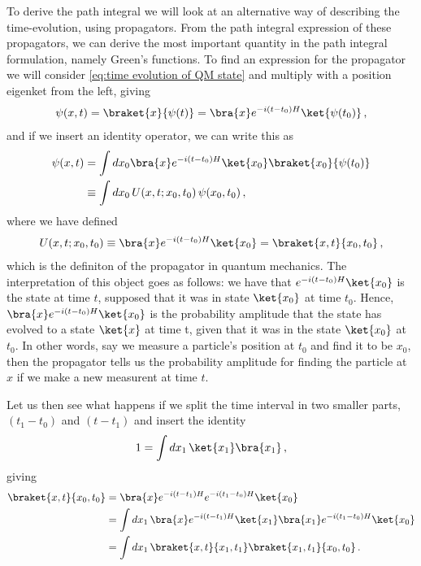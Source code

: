 To derive the path integral we will look at an alternative way of describing the time-evolution, using propagators. From the path integral expression of these propagators, we can derive the most important quantity in the path integral formulation, namely Green's functions. To find an expression for the propagator we will consider \cref{eq:time evolution of QM state} and multiply with a position eigenket from the left, giving
\begin{align}
    \psi(x,t)=\braket{x}{\psi(t)}=\bra{x}e^{-i(t-t_0)H}\ket{\psi(t_0)}\,,
\end{align}
and if we insert an identity operator, we can write this as
\begin{align}
    \psi(x,t)&=\int dx_{0}\bra{x}e^{-i(t-t_0)H}\ket{x_0}\braket{x_0}{\psi(t_0)}\nonumber
    \\
    &\equiv\int dx_{0}\,U(x,t;x_0,t_0)\,\psi(x_0,t_0)\,,
\end{align}
where we have defined 
\begin{align}
    U(x,t;x_0,t_0)\equiv\bra{x}e^{-i(t-t_0)H}\ket{x_0}=\braket{x,t}{x_{0},t_{0}}\,,
\end{align}
which is the definiton of the propagator in quantum mechanics. The interpretation of this object goes as follows: we have that $e^{-i(t-t_0)H}\ket{x_0}$ is the state at time $t$, supposed that it was in state $\ket{x_0}$ at time $t_0$. Hence, $\bra{x}e^{-i(t-t_0)H}\ket{x_0}$ is the probability amplitude that the state has evolved to a state $\ket{x}$ at time t, given that it was in the state $\ket{x_0}$ at $t_0$. In other words, say we measure a particle's position at $t_0$ and find it to be $x_0$, then the propagator tells us the probability amplitude for finding the particle at $x$ if we make a new measurent at time $t$.

Let us then see what happens if we split the time interval in two smaller parts, $(t_1-t_0)$ and $(t-t_1)$ and insert the identity
\begin{align}\label{eq:identity for intermediate states}
    1=\int dx_1\,\ket{x_1}\bra{x_1}\,,
\end{align}
giving
\begin{align}\label{eq:split into two time intervals}
    \braket{x,t}{x_{0},t_{0}}&=\bra{x}e^{-i(t-t_1)H}e^{-i(t_1-t_0)H}\ket{x_0}\nonumber
    \\
    &=\int dx_{1}\,\bra{x}e^{-i(t-t_1)H}\ket{x_1}\bra{x_1}e^{-i(t_1-t_0)H}\ket{x_0}\nonumber
    \\
    &=\int dx_{1}\,\braket{x,t}{x_{1},t_{1}}\braket{x_{1},t_{1}}{x_{0},t_{0}}\,.
\end{align}

